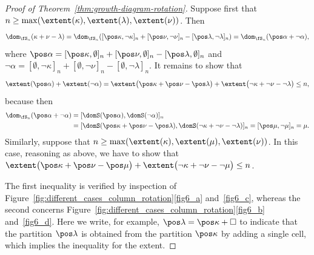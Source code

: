 \begin{proof}[Proof of Theorem~\ref{thm:growth-diagram-rotation}]
 Suppose first that
 $n\geq\max(\extent(\kappa),\extent(\lambda),\extent(\nu))$. Then
 \[
 \dom_{\fS_n}(\kappa+\nu-\lambda)=\dom_{\fS_n}([\pos\kappa,\neg\kappa]_n+[\pos\nu,\neg\nu]_n-[\pos\lambda,\neg\lambda]_n)
 =\dom_{\fS_n}(\pos\alpha + \neg\alpha),
 \]
 where
 $\pos\alpha =
 [\pos\kappa,\emptyset]_n+[\pos\nu,\emptyset]_n-[\pos\lambda,\emptyset]_n$
 and
 $\neg\alpha=[\emptyset,\neg\kappa]_n+[\emptyset,\neg\nu]_n-[\emptyset,\neg\lambda]_n$.
 It remains to show that
 \[
 \extent(\pos\alpha) + \extent(\neg\alpha)
 =\extent\big(\pos\kappa+\pos\nu-\pos\lambda\big) +
 \extent\big(\neg\kappa+\neg\nu-\neg\lambda\big)\leq n,
 \]
 because then
 \begin{align*}
 \dom_{\fS_n}(\pos\alpha+\neg\alpha) &= [\domS(\pos\alpha),\domS(\neg\alpha)]_n\\
 &= [\domS(\pos\kappa+\pos\nu-\pos\lambda),
 \domS(\neg\kappa+\neg\nu-\neg\lambda)]_n = [\pos\mu,\neg\mu]_n =
 \mu.
 \end{align*}
 Similarly, suppose that
 $n\geq\max(\extent(\kappa),\extent(\mu),\extent(\nu))$. In this
 case, reasoning as above, we have to show that
 $\extent\big(\pos\kappa+\pos\nu-\pos\mu\big) +
 \extent\big(\neg\kappa+\neg\nu-\neg\mu\big)\leq n$.

 The first inequality is verified by inspection of
 Figure~\ref{fig:different_cases_column_rotation}\ref{fig6_a} and~\ref{fig6_c}, whereas
 the second concerns
 Figure~\ref{fig:different_cases_column_rotation}\ref{fig6_b} and~\ref{fig6_d}. Here we
 write, for example, $\pos\lambda=\pos\kappa+\square$ to indicate
 that the partition $\pos\lambda$ is obtained from the partition
 $\pos\kappa$ by adding a single cell, which implies the inequality
 for the extent.
\end{proof}

